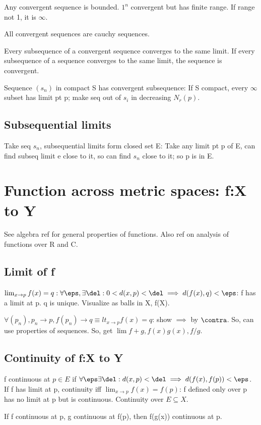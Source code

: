 \documentclass[oneside, article]{memoir}
\begin{document}
Any convergent sequence is bounded. $1^{n}$ convergent but has finite range. If range not 1, it is $\infty$.

All convergent sequences are cauchy sequences.

Every subsequence of a convergent sequence converges to the same limit. If every subsequence of a sequence converges to the same limit, the sequence is convergent.

Sequence $(s_{n})$ in compact S has convergent subsequence: If S compact, every $\infty$ subset has limit pt p; make seq out of $s_{i}$ in decreasing $N_{r}(p)$.

\subsection{Subsequential limits}
Take seq $s_{n}$, subsequential limits form closed set E: Take any limit pt p of E, can find subseq limit e close to it, so can find $s_{n}$ close to it; so p is in E.

\section{Function across metric spaces: f:X to Y}
See algebra ref for general properties of functions. Also ref on analysis of functions over R and C.

\subsection{Limit of f}
$\lim_{x\to p}f(x) = q: \forall \eps, \exists \del: 0< d(x,p) < \del \implies d(f(x), q) < \eps$: f has a limit at p. q is unique. Visualize as balls in X, f(X).

$\forall (p_n), p_n \to p, f(p_n) \to q \equiv lt_{x \to p} f(x) = q$: show $\implies$ by $\contra$. So, can use properties of sequences. So, get $\lim f+g, f(x)g(x), f/g$.

\subsection{Continuity of f:X to Y}
f continuous at $p \in E$ if $\forall \eps \exists \del: d(x,p)<\del \implies d(f(x), f(p))< \eps$. If f has limit at p, continuity iff $\lim_{x \to p} f(x) = f(p)$: f defined only over p has no limit at p but is continuous. Continuity over $E \subseteq X$.

If f continuous at p, g continuous at f(p), then f(g(x)) continuous at p.
\end{document}
